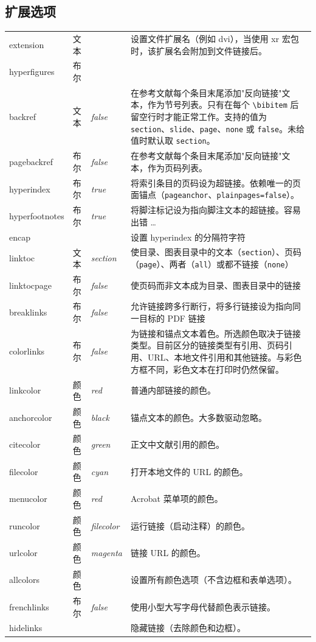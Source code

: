 \documentclass{article}
\newcommand*{\xpackage}[1]{\textsf{#1}}
\begin{document}
\subsection{扩展选项}
\begin{longtable}{@{}>{\ttfamily}ll>{\itshape}lp{8cm}@{}}
extension      & 文本    &         & 设置文件扩展名（例如 \textsf{dvi}），当使用 \xpackage{xr} 宏包时，该扩展名会附加到文件链接后。\\
hyperfigures   & 布尔    &         & \\
backref        & 文本    & false   & 在参考文献每个条目末尾添加"反向链接"文本，作为节号列表。只有在每个 \verb|\bibitem| 后留空行时才能正常工作。支持的值为 \verb|section|、\verb|slide|、\verb|page|、\verb|none| 或 \verb|false|。未给值时默认取 \verb|section|。\\
pagebackref    & 布尔    & false   & 在参考文献每个条目末尾添加"反向链接"文本，作为页码列表。\\
hyperindex     & 布尔    & true    & 将索引条目的页码设为超链接。依赖唯一的页面锚点（\verb|pageanchor|、\verb|plainpages=false|）。\\
hyperfootnotes & 布尔    & true    & 将脚注标记设为指向脚注文本的超链接。容易出错 \ldots\\
encap          &         &         & 设置 hyperindex 的分隔符字符\\
linktoc        & 文本    & section & 使目录、图表目录中的文本（\verb|section|）、页码（\verb|page|）、两者（\verb|all|）或都不链接（\verb|none|）\\
linktocpage    & 布尔    & false   & 使页码而非文本成为目录、图表目录中的链接\\
breaklinks     & 布尔    & false   & 允许链接跨多行断行，将多行链接设为指向同一目标的 PDF 链接\\
colorlinks     & 布尔    & false   & 为链接和锚点文本着色。所选颜色取决于链接类型。目前区分的链接类型有引用、页码引用、URL、本地文件引用和其他链接。与彩色方框不同，彩色文本在打印时仍然保留。\\
linkcolor      & 颜色    & red     & 普通内部链接的颜色。\\
anchorcolor    & 颜色    & black   & 锚点文本的颜色。大多数驱动忽略。\\
citecolor      & 颜色    & green   & 正文中文献引用的颜色。\\
filecolor      & 颜色    & cyan    & 打开本地文件的 URL 的颜色。\\
menucolor      & 颜色    & red     & Acrobat 菜单项的颜色。\\
runcolor       & 颜色    & filecolor & 运行链接（启动注释）的颜色。\\
urlcolor       & 颜色    & magenta & 链接 URL 的颜色。\\
allcolors      & 颜色    &         & 设置所有颜色选项（不含边框和表单选项）。\\
frenchlinks    & 布尔    & false   & 使用小型大写字母代替颜色表示链接。\\
hidelinks      &         &         & 隐藏链接（去除颜色和边框）。\\
\end{longtable} \smallskip
\end{document}
